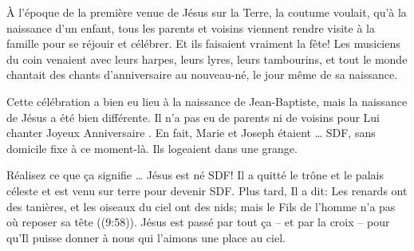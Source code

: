 


À l'époque de la première venue de Jésus sur la Terre, la coutume voulait, qu'à la naissance d'un enfant, tous les parents et voisins viennent rendre visite à la famille pour se réjouir et célébrer. Et ils faisaient vraiment la fête! Les musiciens du coin venaient avec leurs harpes, leurs lyres, leurs tambourins, et tout le monde chantait des chants d'anniversaire au nouveau-né, le jour même de sa naissance.

Cette célébration a bien eu lieu à la naissance de Jean-Baptiste, mais la naissance de Jésus a été bien différente. Il n'a pas eu de parents ni de voisins pour Lui chanter \og Joyeux Anniversaire \fg{}. En fait, Marie et Joseph étaient … SDF, \og sans domicile fixe \fg{} à ce moment-là. Ils logeaient dans une grange.

Réalisez ce que ça signifie … Jésus est né SDF! Il a quitté le trône et le palais céleste et est venu sur terre pour devenir SDF. Plus tard, Il a dit: \og Les renards ont des tanières, et les oiseaux du ciel ont des nids; mais le Fils de l’homme n’a pas où reposer sa tête \fg{} ((9:58)). Jésus est passé par tout ça – et par la croix – pour qu'Il puisse donner à nous qui l'aimons une place au ciel.

